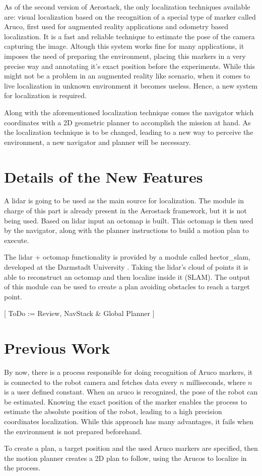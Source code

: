     As of the second version of Aerostack, the only localization techniques available are: visual localization based on the recognition of a special type of marker called Aruco, first used for augmented reality applications and odometry based localization. It is a fast and reliable technique to estimate the pose of the camera capturing the image. Altough this system works fine for many applications, it imposes the need of preparing the environment, placing this markers in a very precise way and annotating it's exact position before the experiments. While this might not be a problem in an augmented reality like scenario, when it comes to live localization in unknown environment it becomes useless. Hence, a new system for localization is required.

    Along with the aforementioned localization technique comes the navigator which coordinates with a 2D geometric planner to accomplish the mission at hand. As the localization technique is to be changed, leading to a new way to perceive the environment, a new navigator and planner will be necessary. 

  \section{Details of the New Features} \label{ch_2:sect:improvements}

    A lidar is going to be used as the main source for localization. The module in charge of this part is already present in the Aerostack framework, but it is not being used. Based on lidar input an octomap is built. This octomap is then used by the navigator, along with the planner instructions to build a motion plan to execute.

    The lidar + octomap functionality is provided by a module called hector\_slam, developed at the Darmstadt University \cite{hector_slam}. Taking the lidar's cloud of points it is able to reconstruct an octomap and then localize inside it (SLAM). The output of this module can be used to create a plan avoiding obstacles to reach a target point.

    [ ToDo := Review, NavStack \& Global Planner ]

  \section{Previous Work} \label{ch_2:sect:previous_work}

    By now, there is a process responsible for doing recognition of Aruco markers, it is connected to the robot camera and fetches data every $n$ milliseconds, where $n$ is a user defined constant. When an aruco is recognized, the pose of the robot can be estimated. Knowing the exact position of the marker enables the process to estimate the absolute position of the robot, leading to a high precision coordinates localization. While this approach has many advantages, it fails when the environment is not prepared beforehand.

    To create a plan, a target position and the used Aruco markers are specified, then the motion planner creates a 2D plan to follow, using the Arucos to localize in the process.

    \begin{comment}
      \begin{itemize}
      \end{itemize}
    \end{comment}

